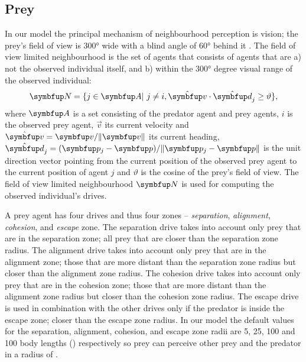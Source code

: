 \subsection{Prey}

In our model the principal mechanism of neighbourhood perception is vision; the prey's field of view is \ang{300} wide with a blind angle of \ang{60} behind it \cite{fernandezjuricic2004visual,reuter2005selforganization}. The field of view limited neighbourhood is the set of agents that consists of agents that are a) not the observed individual itself, and b) within the \ang{300} degree visual range of the observed individual:
%
\begin{equation}
  \set{N} = \{j \in \set{A}|\ j \neq i, \uvec{v}\cdot\uvec{d}_j \geq \vartheta\},
  \label{eq:neighbourhood}
\end{equation}
%
where $\set{A}$ is a set consisting of the predator agent and prey agents, $i$ is the observed prey agent, $\vec{v}$ its current velocity and $\uvec{v}=\vec{v}/\|\vec{v}\|$ its current heading, $\uvec{d}_j=(\vec{p}_j-\vec{p})/\|\vec{p}_j-\vec{p}\|$ is the unit direction vector pointing from the current position of the observed prey agent to the current position of agent $j$ and $\vartheta$ is the cosine of the prey's field of view. The field of view limited neighbourhood $\set{N}$ is used for computing the observed individual's drives.

A prey agent has four drives and thus four zones -- \emph{separation}, \emph{alignment}, \emph{cohesion}, and \emph{escape} zone. The separation drive takes into account only prey that are in the separation zone; \ie all prey that are closer than the separation zone radius. The alignment drive takes into account only prey that are in the alignment zone; \ie those that are more distant than the separation zone radius but closer than the alignment zone radius. The cohesion drive takes into account only prey that are in the cohesion zone; \ie those that are more distant than the alignment zone radius but closer than the cohesion zone radius. The escape drive is used in combination with the other drives only if the predator is inside the escape zone; \ie closer than the escape zone radius. In our model the default values for the separation, alignment, cohesion, and escape zone radii are 5, 25, 100 and 100 body lengths (\si{\bodylength}) respectively so prey can perceive other prey and the predator in a radius of .

